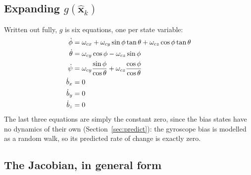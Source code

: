 \documentclass[12pt,a4paper]{article}
\newcommand{\bx}{\bm{x}}
\begin{document}
{\subsection{Expanding \texorpdfstring{$g(\hat{\bx}_k)$}{g}}

Written out fully, $g$ is six equations, one per state variable:
\begin{align}
  \dot\phi   &= \omega_{cx} + \omega_{cy}\sin\phi\tan\theta + \omega_{cz}\cos\phi\tan\theta \notag\\
  \dot\theta &= \omega_{cy}\cos\phi - \omega_{cz}\sin\phi \notag\\
  \dot\psi   &= \omega_{cy}\dfrac{\sin\phi}{\cos\theta} + \omega_{cz}\dfrac{\cos\phi}{\cos\theta} \notag\\
  \dot{b}_x  &= 0 \notag\\
  \dot{b}_y  &= 0 \notag\\
  \dot{b}_z  &= 0
  \label{eq:g-expanded}
\end{align}
The last three equations are simply the constant zero, since the bias
states have no dynamics of their own (Section~\ref{sec:predict}): the
gyroscope bias is modelled as a random walk, so its predicted rate of
change is exactly zero.

\subsection{The Jacobian, in general form}

}
\end{document}
